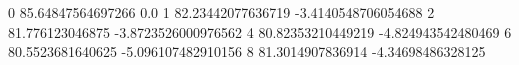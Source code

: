 0 85.64847564697266 0.0
1 82.23442077636719 -3.4140548706054688
2 81.776123046875 -3.8723526000976562
4 80.82353210449219 -4.824943542480469
6 80.5523681640625 -5.096107482910156
8 81.3014907836914 -4.34698486328125
